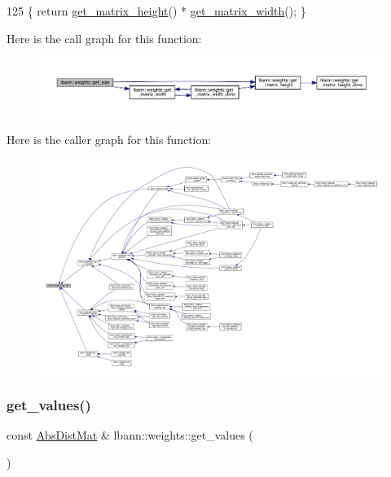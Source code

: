 \begin{DoxyCode}
125 \{ \textcolor{keywordflow}{return} \hyperlink{classlbann_1_1weights_ad36676b9b43bced1cc7e332e3745411f}{get\_matrix\_height}() * \hyperlink{classlbann_1_1weights_abc3cf3a5b992302b1eaaea1fdf3b377d}{get\_matrix\_width}(); \}
\end{DoxyCode}
Here is the call graph for this function\+:\nopagebreak
\begin{figure}[H]
\begin{center}
\leavevmode
\includegraphics[width=350pt]{classlbann_1_1weights_a3216926df0aaf7aa440b9e5317d05fa2_cgraph}
\end{center}
\end{figure}
Here is the caller graph for this function\+:\nopagebreak
\begin{figure}[H]
\begin{center}
\leavevmode
\includegraphics[width=350pt]{classlbann_1_1weights_a3216926df0aaf7aa440b9e5317d05fa2_icgraph}
\end{center}
\end{figure}
\mbox{\label{classlbann_1_1weights_a09fa4082be905c0c124dde3033e2461b}} 
\subsubsection{\texorpdfstring{get\+\_\+values()}{get\_values()}}
{\footnotesize\ttfamily const \hyperlink{base_8hpp_a9a697a504ae84010e7439ffec862b470}{Abs\+Dist\+Mat} \& lbann\+::weights\+::get\+\_\+values (\begin{DoxyParamCaption}{ }\end{DoxyParamCaption})}

